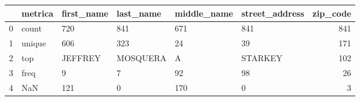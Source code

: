 \begin{tabular}{llllllr}
\toprule
{} & metrica & first\_name & last\_name & middle\_name & street\_address &  zip\_code \\
\midrule
0 &   count &        720 &       841 &         671 &            841 &       841 \\
1 &  unique &        606 &       323 &          24 &             39 &       171 \\
2 &     top &    JEFFREY &  MOSQUERA &           A &        STARKEY &       102 \\
3 &    freq &          9 &         7 &          92 &             98 &        26 \\
4 &     NaN &        121 &         0 &         170 &              0 &         3 \\
\bottomrule
\end{tabular}


